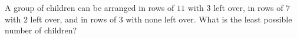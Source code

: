 A group of children can be arranged in rows of $11$ with $3$ left over, in rows of $7$ with $2$ left over, and in rows of $3$ with none left over. What is the least possible number of children?
